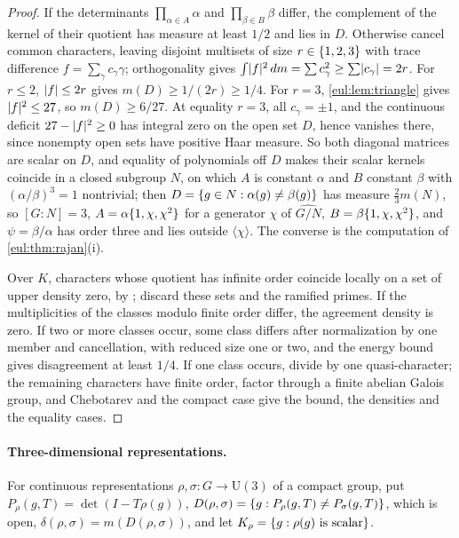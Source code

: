 \begin{proof}
If the determinants $\prod_{\alpha\in A}\alpha$ and $\prod_{\beta\in B}\beta$ differ, the complement of the kernel of
their quotient has measure at least $1/2$ and lies in $D$. Otherwise cancel common characters, leaving disjoint
multisets of size $r\in\{1,2,3\}$ with trace difference $f=\sum_\gamma c_\gamma\gamma$; orthogonality gives
$\int\lvert f\rvert^2\,dm=\sum c_\gamma^2\ge\sum\lvert c_\gamma\rvert=2r$. For $r\le2$, $\lvert f\rvert\le2r$ gives $m(D)\ge1/(2r)\ge1/4$. For
$r=3$, \cref{eul:lem:triangle} gives $\lvert f\rvert^2\le27$, so $m(D)\ge6/27$. At equality $r=3$, all $c_\gamma=\pm1$, and the
continuous deficit $27-\lvert f\rvert^2\ge0$ has integral zero on the open set $D$, hence vanishes there, since nonempty open
sets have positive Haar measure. So both diagonal matrices are scalar on $D$, and equality of polynomials off $D$
makes their scalar kernels coincide in a closed subgroup $N$, on which $A$ is constant $\alpha$ and $B$ constant
$\beta$ with $(\alpha/\beta)^3=1$ nontrivial; then $D=\{g\in N:\alpha(g)\ne\beta(g)\}$ has measure $\frac23m(N)$, so
$[G:N]=3$, $A=\alpha\{1,\chi,\chi^2\}$ for a generator $\chi$ of $\widehat{G/N}$, $B=\beta\{1,\chi,\chi^2\}$, and
$\psi=\beta/\alpha$ has order three and lies outside $\langle\chi\rangle$. The converse is the computation of
\cref{eul:thm:rajan}(i).

Over $K$, characters whose quotient has infinite order coincide locally on a set of upper density zero, by
\cite[Theorem~1]{Rajan2000Refinement}; discard these sets and the ramified primes. If the multiplicities of the
classes modulo finite order differ, the agreement density is zero. If two or more classes occur, some class differs
after normalization by one member and cancellation, with reduced size one or two, and the energy bound gives
disagreement at least $1/4$. If one class occurs, divide by one quasi-character; the remaining characters have finite
order, factor through a finite abelian Galois group, and Chebotarev and the compact case give the bound, the
densities and the equality cases.
\end{proof}

\paragraph{Three-dimensional representations.} For continuous representations $\rho,\sigma\colon G\to\mathrm U(3)$ of a
compact group, put $P_\rho(g,T)=\det(I-T\rho(g))$, $D(\rho,\sigma)=\{g:P_\rho(g,T)\ne P_\sigma(g,T)\}$, which is open,
$\delta(\rho,\sigma)=m(D(\rho,\sigma))$, and let $K_\rho=\{g:\rho(g)\text{ is scalar}\}$.

